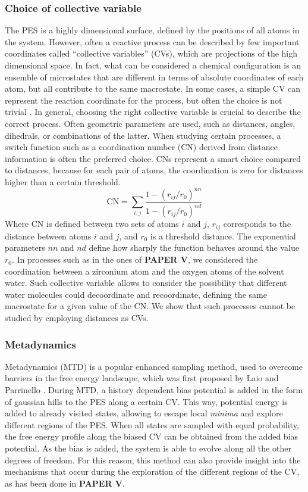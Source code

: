 \subsubsection*{Choice of collective variable}
The PES is a highly dimensional surface, defined by the positions of all atoms in the system. However, often a reactive process can be described by few important coordinates called ``collective variables'' (CVs), which are projections of the high dimensional space. In fact, what can be considered a chemical configuration is an ensemble of microstates that are different in terms of absolute coordinates of each atom, but all contribute to the same macrostate. In some cases, a simple CV can represent the reaction coordinate for the process, but often the choice is not trivial \cite{rohrdanz2013discovering}. In general, choosing the right collective variable is crucial to describe the correct process. Often geometric parameters are used, such as distances, angles, dihedrals, or combinations of the latter. When studying certain processes, a switch function such as a coordination number (CN) derived from distance information is often the preferred choice. CNs represent a smart choice compared to distances, because for each pair of atoms, the coordination is zero for distances higher than a certain threshold.
\[
\mathrm{CN} =\sum_{i,j}\frac{1-(r_{ij}/r_0 )^{nn}}{1-(r_{ij}/r_0 )^{nd}}
\] 
Where CN is defined between two sets of atoms ${i}$ and ${j}$, $r_{ij}$ corresponds to the distance between atoms $i$ and $j$, and $r_0$ is a threshold distance. The exponential parameters $nn$ and $nd$ define how sharply the function behaves around the value $r_0$. In processes such as in the ones of \textbf{PAPER V}, we considered the coordination between a zirconium atom and the oxygen atoms of the solvent water. Such collective variable allows to consider the possibility that different water molecules could decoordinate and recoordinate, defining the same macrostate for a given value of the CN. We show that such processes cannot be studied by employing distances as CVs.

\subsubsection*{Metadynamics}
Metadynamics (MTD) is a popular enhanced sampling method, used to overcome barriers in the free energy landscape, which was first proposed by Laio and Parrinello \cite{laio2002escaping, barducci2011metadynamics}. During MTD, a history dependent bias potential is added in the form of gaussian hills to the PES along a certain CV. This way, potential energy is added to already visited states, allowing to escape local \textit{minima} and explore different regions of the PES. When all states are sampled with equal probability, the free energy profile along the biased CV can be obtained from the added bias potential. As the bias is added, the system is able to evolve along all the other degrees of freedom. For this reason, this method can also provide insight into the mechanisms that occur during the exploration of the different regions of the CV, as has been done in \textbf{PAPER V}. 


